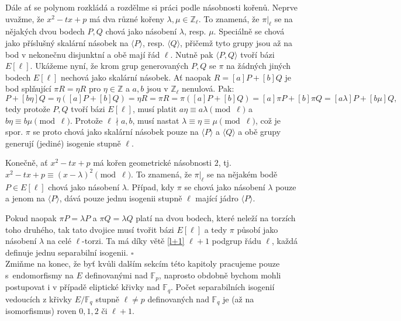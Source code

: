 \documentclass[12pt]{report}
\begin{document}
Dále ať se polynom rozkládá a rozdělme si práci podle násobnosti kořenů. Neprve uvažme, že $x^2 - tx + p$ má dva různé kořeny $\lambda, \mu \in \mathbb{Z}_{\ell}$. To znamená, že $\pi \vert_{\ell}$ se na nějakých dvou bodech $P,Q$ chová jako násobení $\lambda$, resp. $\mu$. Speciálně se chová jako příslušný skalární násobek na $\langle P \rangle$, resp. $\langle Q \rangle$, přičemž tyto grupy jsou až na bod v nekonečnu disjunktní a obě mají řád $\ell$. Nutně pak $\langle P,Q \rangle$ tvoří bázi $E[\ell]$. Ukážeme nyní, že krom grup generovaných $P,Q$ se $\pi$ na žádných jiných bodech $E[\ell]$ nechová jako skalární násobek. Ať naopak $R = [a]P + [b]Q$ je bod splňující $\pi R = \eta R$ pro $\eta \in \mathbb{Z}$ a $a,b$ jsou v $\mathbb{Z}_{\ell}$ nenulová. Pak:
\begin{equation*} 
[a \eta] P + [b \eta] Q = \eta ([a]P + [b]Q) = \eta R = \pi R = \pi ([a]P + [b]Q) = [a]\pi P + [b] \pi Q = [a \lambda] P + [b \mu] Q,
\end{equation*}
tedy protože $P,Q$ tvoří bázi $E[\ell]$, musí platit $a \eta \equiv a \lambda \pmod{\ell}$ a $b \eta \equiv b \mu \pmod{\ell}$. Protože $\ell \nmid a,b$, musí nastat $\lambda \equiv \eta \equiv \mu \pmod{\ell}$, což je spor. $\pi$ se proto chová jako skalární násobek pouze na $\langle P \rangle$ a $\langle Q \rangle$ a obě grupy generují (jediné) isogenie stupně $\ell$.

Konečně, ať $x^2 - tx + p$ má kořen geometrické násobnosti $2$, tj. $x^2 - tx + p \equiv (x-\lambda)^2 \pmod{\ell}$. To znamená, že $\pi \vert_{\ell}$ se na nějakém bodě $P \in E[\ell]$ chová jako násobení $\lambda$. Případ, kdy $\pi$ se chová jako násobení $\lambda$ pouze a jenom na $\langle P \rangle$, dává pouze jednu isogenii stupně $\ell$ mající jádro $\langle P \rangle$.

Pokud naopak $\pi P = \lambda P$ a $\pi Q = \lambda Q$ platí na dvou bodech, které neleží na torzích toho druhého, tak tato dvojice musí tvořit bázi $E[\ell]$ a tedy $\pi$ působí jako násobení $\lambda$ na celé $\ell$-torzi. Ta má díky větě \ref{l+1} $\ell+1$ podgrup řádu $\ell$, každá definuje jednu separabilní isogenii. \hfill $\square$\\

Zmiňme na konec, že byť kvůli dalším sekcím této kapitoly pracujeme pouze s~endomorfismy na $E$ definovanými nad $\mathbb{F}_p$, naprosto obdobně bychom mohli postupovat i v případě eliptické křivky nad $\mathbb{F}_q$. Počet separabilních isogenií vedoucích z křivky $E/\mathbb{F}_q$ stupně $\ell \neq p$ definovaných nad $\mathbb{F}_q$ je (až na isomorfismus) roven $0,1,2$ či $\ell+1$.
\end{document}

